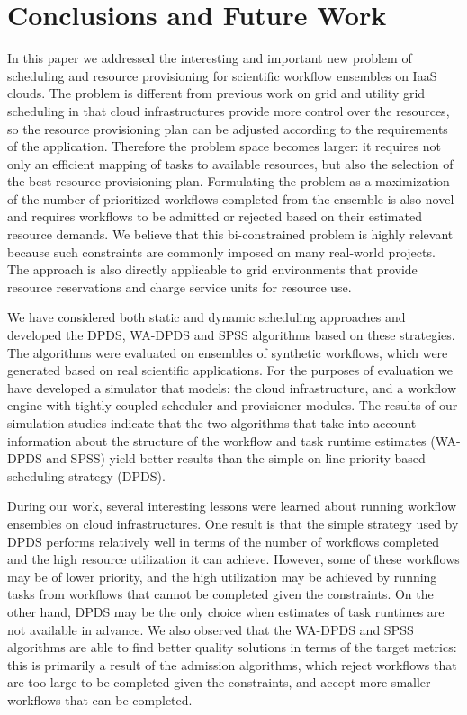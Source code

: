 \documentclass{sig-alternate}
\begin{document}
\section{Conclusions and Future Work}
\label{sec:conclusions}

In this paper we addressed the interesting and important new problem of 
scheduling and resource provisioning for scientific workflow ensembles 
on IaaS clouds. The problem is different from previous work on grid and 
utility grid scheduling in that cloud infrastructures provide more control 
over the resources, so the resource provisioning plan can be adjusted 
according to the requirements of the application. Therefore the problem 
space becomes larger: it requires not only an efficient mapping of tasks
to available resources, but also the selection of the best resource 
provisioning plan. Formulating the problem as a maximization of the
number of prioritized workflows completed from the ensemble is also novel and  
requires workflows to be admitted or rejected based on their estimated 
resource demands. We believe that this bi-constrained problem is highly 
relevant because such constraints are commonly imposed on many real-world 
projects. The approach is also directly applicable to grid environments 
that provide resource reservations and charge service units for resource use.

We have considered both static and dynamic scheduling approaches and 
developed the DPDS, WA-DPDS and SPSS algorithms based on these 
strategies. The algorithms were evaluated on ensembles of synthetic 
workflows, which were generated based on real scientific applications. For 
the purposes of evaluation we have developed a simulator that models: the 
cloud infrastructure, and a workflow engine with tightly-coupled scheduler 
and provisioner modules. The results of our simulation studies indicate 
that the two algorithms that take into account information about the 
structure of the workflow and task runtime estimates (WA-DPDS and SPSS) 
yield better results than the simple on-line priority-based scheduling 
strategy (DPDS).

During our work, several interesting lessons were learned about running 
workflow ensembles on cloud infrastructures. One result is that the simple 
strategy used by DPDS performs relatively well in terms of the number of 
workflows completed and the high resource utilization it can achieve. However,
some of these workflows may be of lower priority, and the high utilization
may be achieved by running tasks from workflows that cannot be completed
given the constraints. On the other hand, DPDS may be the only choice when 
estimates of task runtimes are not available in advance. We also observed
that the WA-DPDS and SPSS algorithms are able to find better quality 
solutions in terms of the target metrics: this is primarily a result of the 
admission algorithms, which reject workflows that are too large to be 
completed given the constraints, and accept more smaller workflows that 
can be completed.
\end{document}
